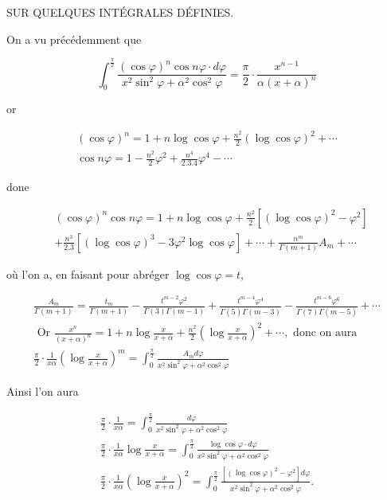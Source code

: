 \documentclass{article}
\begin{document}
SUR QUELQUES INTÉGRALES DÉFINIES.

On a vu précédemment que

\[
\int_{0}^{\frac{\pi}{2}} \frac{(\cos \varphi)^{n} \cos n \varphi \cdot d \varphi}{x^{2} \sin ^{2} \varphi+\alpha^{2} \cos ^{2} \varphi}=\frac{\pi}{2} \cdot \frac{x^{n-1}}{\alpha(x+\alpha)^{n}}
\]

or

\[
\begin{gathered}
(\cos \varphi)^{n}=1+n \log \cos \varphi+\frac{n^{2}}{2}(\log \cos \varphi)^{2}+\cdots \\
\cos n \varphi=1-\frac{n^{2}}{2} \varphi^{2}+\frac{n^{4}}{2.3 .4} \varphi^{4}-\cdots
\end{gathered}
\]

done

\[
\begin{aligned}
& (\cos \varphi)^{n} \cos n \varphi=1+n \log \cos \varphi+\frac{n^{2}}{2}\left[(\log \cos \varphi)^{2}-\varphi^{2}\right] \\
& +\frac{n^{3}}{2.3}\left[(\log \cos \varphi)^{3}-3 \varphi^{2} \log \cos \varphi\right]+\cdots+\frac{n^{m}}{\Gamma(m+1)} A_{m}+\cdots
\end{aligned}
\]

où l'on a, en faisant pour abréger \(\log \cos \varphi=t\),

\[
\begin{gathered}
\frac{A_{m}}{\Gamma(m+1)}=\frac{t_{m}}{\Gamma(m+1)}-\frac{t^{m-2} \varphi^{2}}{\Gamma(3) \Gamma(m-1)}+\frac{t^{m-4} \varphi^{4}}{\Gamma(5) \Gamma(m-3)}-\frac{t^{m-6} \varphi^{6}}{\Gamma(7) \Gamma(m-5)}+\cdots \\
\text { Or } \frac{x^{n}}{(x+\alpha)^{n}}=1+n \log \frac{x}{x+\alpha}+\frac{n^{2}}{2}\left(\log \frac{x}{x+\alpha}\right)^{2}+\cdots, \text { donc on aura } \\
\frac{\pi}{2} \cdot \frac{1}{x \alpha}\left(\log \frac{x}{x+\alpha}\right)^{m}=\int_{0}^{\frac{\pi}{2}} \frac{A_{m} d \varphi}{x^{2} \sin ^{2} \varphi+\alpha^{2} \cos ^{2} \varphi}
\end{gathered}
\]

Ainsi l'on aura

\[
\begin{gathered}
\frac{\pi}{2} \cdot \frac{1}{x \alpha}=\int_{0}^{\frac{\pi}{2}} \frac{d \varphi}{x^{2} \sin ^{2} \varphi+\alpha^{2} \cos ^{2} \varphi} \\
\frac{\pi}{2} \cdot \frac{1}{x \alpha} \log \frac{x}{x+\alpha}=\int_{0}^{\frac{\pi}{2}} \frac{\log \cos \varphi \cdot d \varphi}{x^{2} \sin ^{2} \varphi+\alpha^{2} \cos ^{2} \varphi} \\
\frac{\pi}{2} \cdot \frac{1}{x \alpha}\left(\log \frac{x}{x+\alpha}\right)^{2}=\int_{0}^{\frac{\pi}{2}} \frac{\left[(\log \cos \varphi)^{2}-\varphi^{2}\right] d \varphi}{x^{2} \sin ^{2} \varphi+\alpha^{2} \cos ^{2} \varphi} .
\end{gathered}
\]
\end{document}
